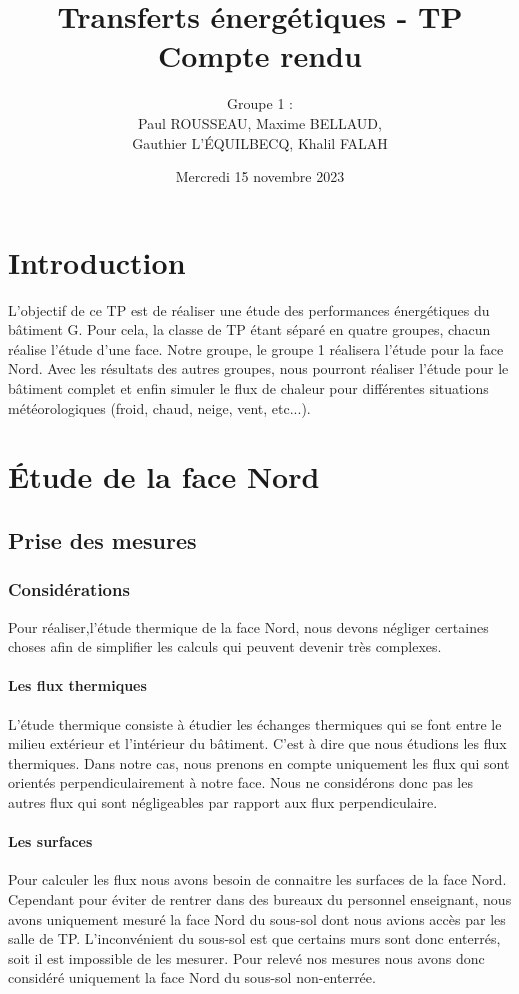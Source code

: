 \documentclass[12pt, a4paper]{article}
\title{Transferts énergétiques - TP \\
Compte rendu}
\author{Groupe 1 : \\
Paul ROUSSEAU, Maxime BELLAUD, \\
Gauthier L'ÉQUILBECQ, Khalil FALAH}
\date{Mercredi 15 novembre 2023}
\begin{document}
\maketitle

\tableofcontents

\section{Introduction}

L'objectif de ce TP est de réaliser une étude des performances énergétiques du bâtiment G. Pour cela, la classe de TP étant séparé en quatre groupes, chacun réalise l'étude d'une face. Notre groupe, le groupe 1 réalisera l'étude pour la face Nord. Avec les résultats des autres groupes, nous pourront réaliser l'étude pour le bâtiment complet et enfin simuler le flux de chaleur pour différentes situations météorologiques (froid, chaud, neige, vent, etc...).

\section{Étude de la face Nord}

\subsection{Prise des mesures}


\subsubsection{Considérations }

Pour réaliser,l'étude thermique de la face Nord, nous devons négliger certaines choses afin de simplifier les calculs qui peuvent devenir très complexes. 

\paragraph{Les flux thermiques \\}
L'étude thermique consiste à étudier les échanges thermiques qui se font entre le milieu extérieur et l'intérieur du bâtiment. C'est à dire que nous étudions les flux thermiques. Dans notre cas, nous prenons en compte uniquement les flux qui sont orientés perpendiculairement à notre face. Nous ne considérons donc pas les autres flux qui sont négligeables par rapport aux flux perpendiculaire. 

\paragraph{Les surfaces\\}
Pour calculer les flux nous avons besoin de connaitre les surfaces de la face Nord. Cependant pour éviter de rentrer dans des bureaux du personnel enseignant, nous avons uniquement mesuré la face Nord du sous-sol dont nous avions accès par les salle de TP. L'inconvénient du sous-sol est que certains murs sont donc enterrés, soit il est impossible de les mesurer. Pour relevé nos mesures nous avons donc considéré uniquement la face Nord du sous-sol non-enterrée.
\end{document}
